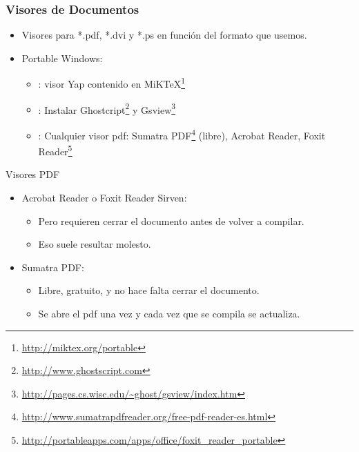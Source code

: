\documentclass[aspectratio=1610]{beamer}%
\begin{document}
\begin{frame}[fragile]
\frametitle{\textbf{Visores de Documentos}}
\justifying
 
 \begin{itemize}\justifying
  \item Visores para *.pdf, *.dvi y *.ps en función del formato que usemos.
  \item Portable Windows:
  \begin{itemize}\justifying
  \item [.dvi]: visor Yap contenido en MiK\TeX{}\footnote{\url{http://miktex.org/portable}}
  \item [.ps]: Instalar Ghostcript\footnote{\url{http://www.ghostscript.com}} y Gsview\footnote{\url{http://pages.cs.wisc.edu/~ghost/gsview/index.htm}}
  \item [.pdf]: Cualquier visor pdf: Sumatra PDF\footnote{\url{http://www.sumatrapdfreader.org/free-pdf-reader-es.html}} (libre), Acrobat Reader, Foxit Reader\footnote{\url{http://portableapps.com/apps/office/foxit_reader_portable}}
\end{itemize}
\end{itemize}
\begin{block}{Visores PDF}
\begin{itemize}\justifying
  \item Acrobat Reader o Foxit Reader Sirven:
  \begin{itemize}\justifying
  \item Pero requieren cerrar el documento antes de volver a compilar.
  \item Eso suele resultar molesto.
\end{itemize}

  \item Sumatra PDF:
  \begin{itemize}\justifying
  \item Libre, gratuito, y no hace falta cerrar el documento.
  \item Se abre el pdf una vez y cada vez que se compila se actualiza.
\end{itemize}

\end{itemize}

\end{block}

 
\end{frame}




\end{document}
